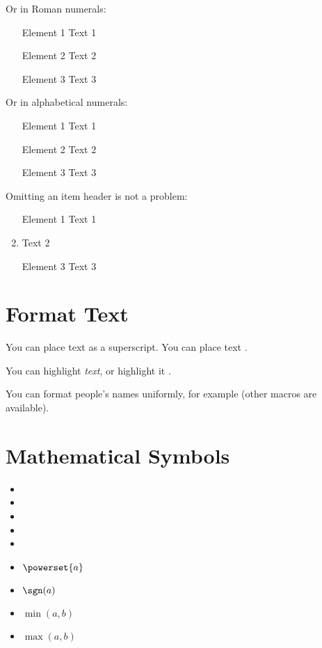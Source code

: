 \documentclass[english]{spimutbmphdthesis}
\begin{document}
Or in Roman numerals:
\begin{enumerate}[i]
\item[Element 1] Text 1
\item[Element 2] Text 2
\item[Element 3] Text 3
\end{enumerate}

Or in alphabetical numerals:
\begin{enumerate}[a]
\item[Element 1] Text 1
\item[Element 2] Text 2
\item[Element 3] Text 3
\end{enumerate}

Omitting an item header is not a problem:
\begin{enumerate}
\item[Element 1] Text 1
\item Text 2
\item[Element 3] Text 3
\end{enumerate}

\section{Format Text}

You can place text \textup{as a superscript}. You can place text .

You can highlight \emph{text}, or highlight it .

You can format people's names uniformly, for example  (other macros are available).

\section{Mathematical Symbols}

\begin{itemize}
\item \R
\item \N
\item \Z
\item \Q
\item \C
\item $\powerset{a}$
\item $\sgn(a)$
\item $\min(a, b)$
\item $\max(a, b)$
\end{itemize}
\end{document}

